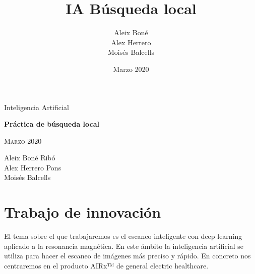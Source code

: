 

\usepackage[bottom]{footmisc}

\usepackage{amsmath}
\usepackage[justification=centering]{caption}

\title{IA Búsqueda local}
\author{%
    Aleix Boné\\
    Alex Herrero\\
    Moisés Balcells
}
\date{%
Marzo 2020
}

 


\thispagestyle{empty}
\clearpage
\setcounter{page}{-1}

\begin{titlepage}
{
    \centering
    \null
    \vfill
    {\Large Inteligencia Artificial\par}
    \vspace{2em}
    {\Huge \bfseries 
    Práctica de búsqueda local
    \par}
    \vspace{2em}
    {\large \scshape 
    Marzo 2020
    \par}
    \vfill
\begin{center}
    
\end{center}
    \vspace{3cm}

    \vfill
    {\raggedleft \large
Aleix Boné Ribó\\
Alex Herrero Pons\\
    Moisés Balcells
        \par}
}
\end{titlepage}

\pagebreak

\thispagestyle{empty}
\clearpage
\setcounter{page}{0}

\tableofcontents

\pagebreak

\section{Trabajo de innovación}

El tema sobre el que trabajaremos es el escaneo inteligente con deep learning aplicado a la resonancia magnética. 
En este ámbito la inteligencia artificial se utiliza para hacer el escaneo de imágenes más preciso y rápido. 
En concreto nos centraremos en el producto AIRx™ de general electric healthcare.



